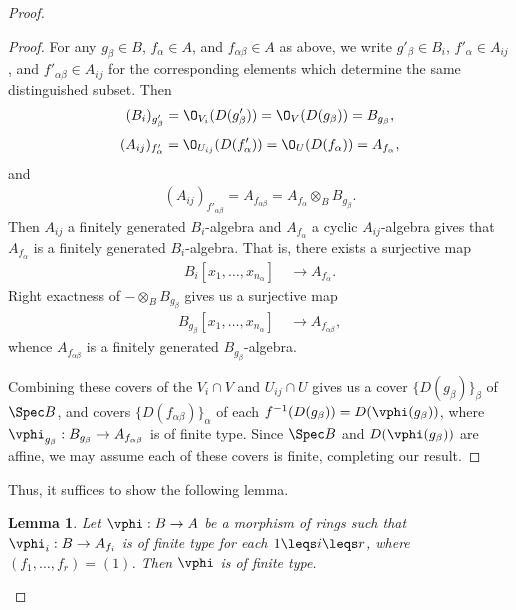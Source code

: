 \documentclass[12pt]{amsart}
\newtheorem*{lemma}{Lemma}
\begin{document}
\begin{proof}
\begin{proof}
    For any $g_\beta\in B$, $f_\alpha\in A$, and $f_{\alpha\beta}\in A$ as above, we write $g'_\beta\in B_i$, $f'_\alpha\in A_{ij}$, and $f'_{\alpha\beta}\in A_{ij}$ for the corresponding elements which determine the same distinguished subset.
    Then
    \begin{align*}
      (B_i)_{g'_\beta} 
      = \O_{V_i}(D(g'_\beta)) 
      = \O_V(D(g_\beta))
      = B_{g_\beta},
    \end{align*}
    \begin{align*}
      (A_{ij})_{f'_\alpha} 
      = \O_{U_{ij}}(D(f'_\alpha))  
      = \O_U(D(f_\alpha)) 
      = A_{f_\alpha},
    \end{align*}
    and
    \begin{align*}
      (A_{ij})_{f'_{\alpha\beta}}
      = A_{f_{\alpha\beta}}
      = A_{f_\alpha}\otimes_B B_{g_{\beta}}.
    \end{align*}
    Then $A_{ij}$ a finitely generated $B_i$-algebra and $A_{f_\alpha}$ a cyclic $A_{ij}$-algebra gives that $A_{f_\alpha}$ is a finitely generated $B_i$-algebra.
    That is, there exists a surjective map
    \begin{align*}
      B_i[x_1,\ldots, x_{n_\alpha}]~&\rightarrow A_{f_\alpha}.
    \end{align*}
    Right exactness of $-\otimes_B B_{g_\beta}$ gives us a surjective map
    \begin{align*}
      B_{g_\beta}[x_1,\ldots, x_{n_\alpha}]~&\rightarrow A_{f_{\alpha\beta}},
    \end{align*}
    whence $A_{f_{\alpha\beta}}$ is a finitely generated $B_{g_\beta}$-algebra.

    Combining these covers of the $V_i\cap V$ and $U_{ij}\cap U$ gives us a cover $\{D(g_\beta)\}_\beta$ of $\Spec B$, and covers $\{D(f_{\alpha\beta}) \}_\alpha$ of each $f^{-1}(D(g_\beta))=D(\vphi(g_\beta))$, where $\vphi_{g_\beta}:B_{g_\beta}\to A_{f_{\alpha\beta}}$ is of finite type.
    Since $\Spec B$ and $D(\vphi(g_\beta))$ are affine, we may assume each of these covers is finite, completing our result.
  \end{proof}

  Thus, it suffices to show the following lemma.

  \begin{lemma}
    Let $\vphi:B\to A$ be a morphism of rings such that $\vphi_i:B\to A_{f_i}$ is of finite type for each $1\leqs i\leqs r$, where $(f_1,\ldots, f_r)=(1)$.
    Then $\vphi$ is of finite type.
  \end{lemma}


\end{proof}
\end{document}
